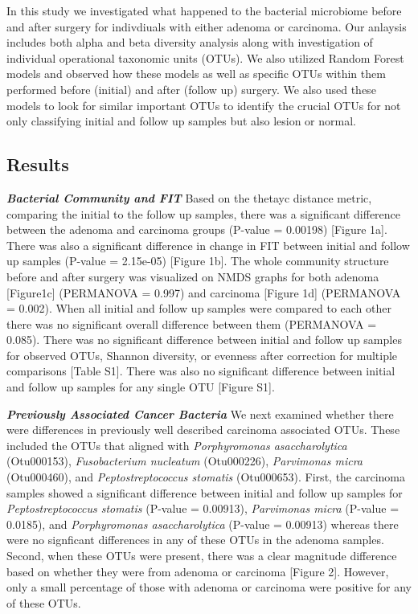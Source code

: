 \documentclass[12pt,]{article}
\begin{document}
In this study we investigated what happened to the bacterial microbiome
before and after surgery for indivdiuals with either adenoma or
carcinoma. Our anlaysis includes both alpha and beta diversity analysis
along with investigation of individual operational taxonomic units
(OTUs). We also utilized Random Forest models and observed how these
models as well as specific OTUs within them performed before (initial)
and after (follow up) surgery. We also used these models to look for
similar important OTUs to identify the crucial OTUs for not only
classifying initial and follow up samples but also lesion or normal.

\newpage

\subsection{Results}\label{results}

\textbf{\emph{Bacterial Community and FIT}} Based on the thetayc
distance metric, comparing the initial to the follow up samples, there
was a significant difference between the adenoma and carcinoma groups
(P-value = 0.00198) {[}Figure 1a{]}. There was also a significant
difference in change in FIT between initial and follow up samples
(P-value = 2.15e-05) {[}Figure 1b{]}. The whole community structure
before and after surgery was visualized on NMDS graphs for both adenoma
{[}Figure1c{]} (PERMANOVA = 0.997) and carcinoma {[}Figure 1d{]}
(PERMANOVA = 0.002). When all initial and follow up samples were
compared to each other there was no significant overall difference
between them (PERMANOVA = 0.085). There was no significant difference
between initial and follow up samples for observed OTUs, Shannon
diversity, or evenness after correction for multiple comparisons
{[}Table S1{]}. There was also no significant difference between initial
and follow up samples for any single OTU {[}Figure S1{]}.

\textbf{\emph{Previously Associated Cancer Bacteria}} We next examined
whether there were differences in previously well described carcinoma
associated OTUs. These included the OTUs that aligned with
\emph{Porphyromonas asaccharolytica} (Otu000153), \emph{Fusobacterium
nucleatum} (Otu000226), \emph{Parvimonas micra} (Otu000460), and
\emph{Peptostreptococcus stomatis} (Otu000653). First, the carcinoma
samples showed a significant difference between initial and follow up
samples for \emph{Peptostreptococcus stomatis} (P-value = 0.00913),
\emph{Parvimonas micra} (P-value = 0.0185), and \emph{Porphyromonas
asaccharolytica} (P-value = 0.00913) whereas there were no signficant
differences in any of these OTUs in the adenoma samples. Second, when
these OTUs were present, there was a clear magnitude difference based on
whether they were from adenoma or carcinoma {[}Figure 2{]}. However,
only a small percentage of those with adenoma or carcinoma were positive
for any of these OTUs.
\end{document}
